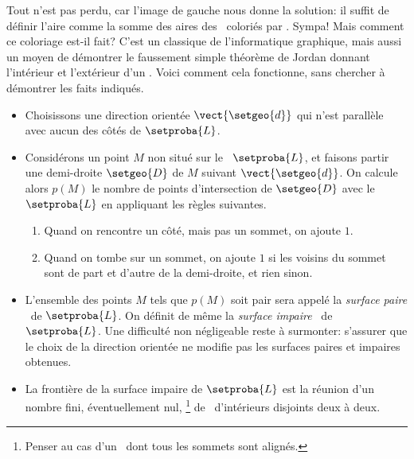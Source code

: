 Tout n'est pas perdu, car l'image de gauche nous donne la solution: il suffit de définir l'aire comme la somme des aires des \ngones\ coloriés par \geogebra. Sympa! Mais comment ce coloriage est-il fait? C'est un classique de l'informatique graphique, mais aussi un moyen de démontrer le faussement simple théorème de Jordan donnant l'intérieur et l'extérieur d'un \ngone. Voici comment cela fonctionne, sans chercher à démontrer les faits indiqués.
%
\begin{itemize}
	\item Choisissons une direction orientée $\vect{\setgeo{d}}$ qui n'est parallèle avec aucun des côtés de $\setproba{L}$.

	\item Considérons un point $M$ non situé sur le \ncycle\ $\setproba{L}$, et faisons partir une demi-droite $\setgeo{D}$ de $M$ suivant $\vect{\setgeo{d}}$.
	On calcule alors $p(M)$ le nombre de points d'intersection de $\setgeo{D}$ avec le \ncycle\ $\setproba{L}$ en appliquant les règles suivantes.
	\begin{enumerate}
		\item Quand on rencontre un côté, mais pas un sommet, on ajoute $1$.

		\item Quand on tombe sur un sommet, on ajoute $1$ si les voisins du sommet sont de part et d'autre de la demi-droite, et rien sinon.
	\end{enumerate}

	\item L'ensemble des points $M$ tels que $p(M)$ soit pair sera appelé la \og \emph{surface paire} \fg\ de $\setproba{L}$. 
	On définit de même la \og \emph{surface impaire} \fg\ de $\setproba{L}$.
	Une difficulté non négligeable reste à surmonter: s'assurer que le choix de la direction orientée ne modifie pas les surfaces paires et impaires obtenues.

	\item La frontière de la surface impaire de $\setproba{L}$ est la réunion d'un nombre fini, éventuellement nul,%
	\footnote{
		Penser au cas d'un \ncycle\ dont tous les sommets sont alignés.
	}
	de \ngones\ d'intérieurs disjoints deux à deux.
\end{itemize}


